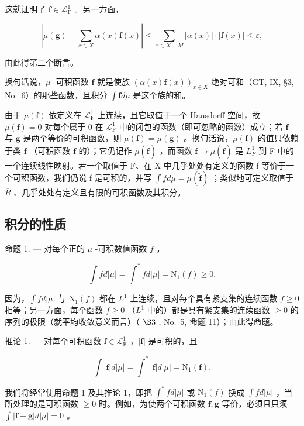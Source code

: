 这就证明了 \(\mathbf{f} \in \mathcal{L}_{\mathrm{F}}^{1}\) 。另一方面，

\[
\left| \mu (\mathbf {g}) - \sum_ {x \in X} \alpha (x) \mathbf {f} (x) \right| \leqslant \sum_ {x \in X - M} | \alpha (x) | \cdot | \mathbf {f} (x) | \leqslant \varepsilon ,
\]

由此得第二个断言。

换句话说，\(\mu\) -可积函数 \(\mathbf{f}\) 就是使族 \((\alpha(x)\mathbf{f}(x))_{x\in X}\) 绝对可和（GT, IX, §3, No.~6）的那些函数，且积分 \(\int \mathbf{f} d\mu\) 是这个族的和。

由于 \(\mu(\mathbf{f})\) 依定义在 \(\mathcal{L}_{\mathrm{F}}^{1}\) 上连续，且它取值于一个 Hausdorff 空间，故 \(\mu(\mathbf{f}) = 0\) 对每个属于 0 在 \(\mathcal{L}_{\mathrm{F}}^{1}\) 中的闭包的函数（即可忽略的函数）成立；若 \(\mathbf{f}\) 与 \(\mathbf{g}\) 是两个等价的可积函数，则 \(\mu(\mathbf{f}) = \mu(\mathbf{g})\) 。换句话说，\(\mu(\mathbf{f})\) 的值只依赖于类 \(\widetilde{\mathbf{f}}\) （可积函数 \(\mathbf{f}\) 的）；它仍记作 \(\mu(\widetilde{\mathbf{f}})\) ，而函数 \(\widetilde{\mathbf{f}} \mapsto \mu(\widetilde{\mathbf{f}})\) 是 \(L_{F}^{1}\) 到 F 中的一个连续线性映射。若一个取值于 F、在 X 中几乎处处有定义的函数 f 等价于一个可积函数，我们仍说 f 是可积的，并写 \(\int f d\mu = \mu(\widetilde{\mathbf{f}})\) ；类似地可定义取值于 \(\overline{R}\) 、几乎处处有定义且有限的可积函数及其积分。

\subsection{积分的性质}

命题 1. --- 对每个正的 \(\mu\) -可积数值函数 \(f\) ，

\[
\int f d | \mu | = \int^ {*} f d | \mu | = \mathrm{N} _ {1} (f) \geqslant 0.\tag{2}
\]

因为，\(\int f d|\mu|\) 与 \(\mathrm{N}_{1}(f)\) 都在 \(L^{1}\) 上连续，且对每个具有紧支集的连续函数 \(f \geqslant 0\) 相等；另一方面，每个函数 \(f \geqslant 0\) （\(L^{1}\) 中的）都是具有紧支集的连续函数 \(\geqslant 0\) 的序列的极限（就平均收敛意义而言）（ \(\S3\) , No.~5, 命题 11）；由此得命题。

推论 1. --- 对每个可积函数 \(\mathbf{f} \in \mathcal{L}_{\mathrm{F}}^{1}\) ，\(|\mathbf{f}|\) 是可积的，且

\[
\int | \mathbf {f} | d | \mu | = \int^ {*} | \mathbf {f} | d | \mu | = \mathrm{N} _ {1} (\mathbf {f}).\tag{3}
\]

我们将经常使用命题 1 及其推论 1，即把 \(\int^{*}fd|\mu|\) 或 \(\mathrm{N}_{1}(f)\) 换成 \(\int fd|\mu|\) ，当所处理的是可积函数 \(\geqslant 0\) 时。例如，为使两个可积函数 \(\mathbf{f},\mathbf{g}\) 等价，必须且只须 \(\int |\mathbf{f} - \mathbf{g}|d|\mu| = 0\) 。

